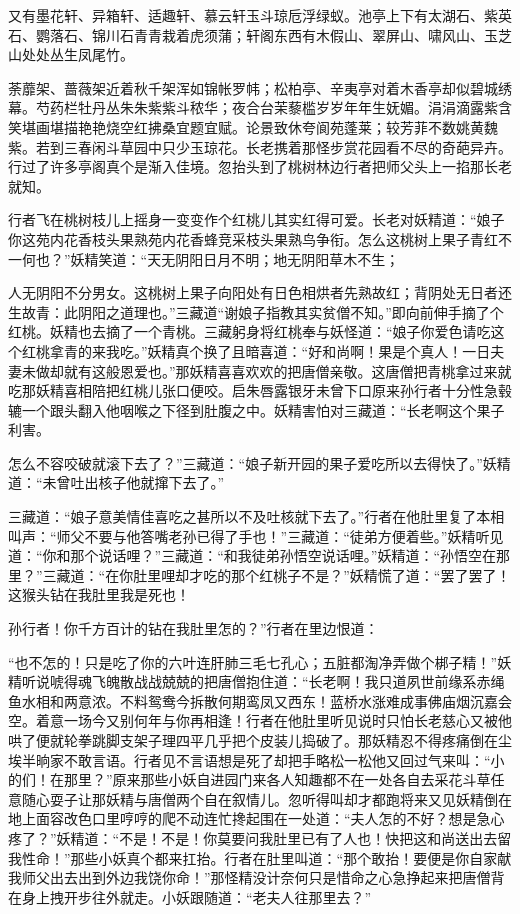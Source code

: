 \documentclass[12pt,UTF8]{ctexbook}
\begin{document}
{	又有墨花轩、异箱轩、适趣轩、慕云轩玉斗琼卮浮绿蚁。池亭上下有太湖石、紫英石、鹦落石、锦川石青青栽着虎须蒲；轩阁东西有木假山、翠屏山、啸风山、玉芝山处处丛生凤尾竹。
	
	荼蘼架、蔷薇架近着秋千架浑如锦帐罗帏；松柏亭、辛夷亭对着木香亭却似碧城绣幕。芍药栏牡丹丛朱朱紫紫斗秾华；夜合台茉藜槛岁岁年年生妩媚。涓涓滴露紫含笑堪画堪描艳艳烧空红拂桑宜题宜赋。论景致休夸阆苑蓬莱；较芳菲不数姚黄魏紫。若到三春闲斗草园中只少玉琼花。长老携着那怪步赏花园看不尽的奇葩异卉。行过了许多亭阁真个是渐入佳境。忽抬头到了桃树林边行者把师父头上一掐那长老就知。
	
	行者飞在桃树枝儿上摇身一变变作个红桃儿其实红得可爱。长老对妖精道：“娘子你这苑内花香枝头果熟苑内花香蜂竞采枝头果熟鸟争衔。怎么这桃树上果子青红不一何也？”妖精笑道：“天无阴阳日月不明；地无阴阳草木不生；
	
	人无阴阳不分男女。这桃树上果子向阳处有日色相烘者先熟故红；背阴处无日者还生故青：此阴阳之道理也。”三藏道“谢娘子指教其实贫僧不知。”即向前伸手摘了个红桃。妖精也去摘了一个青桃。三藏躬身将红桃奉与妖怪道：“娘子你爱色请吃这个红桃拿青的来我吃。”妖精真个换了且暗喜道：“好和尚啊！果是个真人！一日夫妻未做却就有这般恩爱也。”那妖精喜喜欢欢的把唐僧亲敬。这唐僧把青桃拿过来就吃那妖精喜相陪把红桃儿张口便咬。启朱唇露银牙未曾下口原来孙行者十分性急毂辘一个跟头翻入他咽喉之下径到肚腹之中。妖精害怕对三藏道：“长老啊这个果子利害。
	
	怎么不容咬破就滚下去了？”三藏道：“娘子新开园的果子爱吃所以去得快了。”妖精道：“未曾吐出核子他就撺下去了。”
	
	三藏道：“娘子意美情佳喜吃之甚所以不及吐核就下去了。”行者在他肚里复了本相叫声：“师父不要与他答嘴老孙已得了手也！”三藏道：“徒弟方便着些。”妖精听见道：“你和那个说话哩？”三藏道：“和我徒弟孙悟空说话哩。”妖精道：“孙悟空在那里？”三藏道：“在你肚里哩却才吃的那个红桃子不是？”妖精慌了道：“罢了罢了！这猴头钻在我肚里我是死也！
	
	孙行者！你千方百计的钻在我肚里怎的？”行者在里边恨道：
	
	“也不怎的！只是吃了你的六叶连肝肺三毛七孔心；五脏都淘净弄做个梆子精！”妖精听说唬得魂飞魄散战战兢兢的把唐僧抱住道：“长老啊！我只道夙世前缘系赤绳鱼水相和两意浓。不料鸳鸯今拆散何期鸾凤又西东！蓝桥水涨难成事佛庙烟沉嘉会空。着意一场今又别何年与你再相逢！行者在他肚里听见说时只怕长老慈心又被他哄了便就轮拳跳脚支架子理四平几乎把个皮装儿捣破了。那妖精忍不得疼痛倒在尘埃半晌家不敢言语。行者见不言语想是死了却把手略松一松他又回过气来叫：“小的们！在那里？”原来那些小妖自进园门来各人知趣都不在一处各自去采花斗草任意随心耍子让那妖精与唐僧两个自在叙情儿。忽听得叫却才都跑将来又见妖精倒在地上面容改色口里哼哼的爬不动连忙搀起围在一处道：“夫人怎的不好？想是急心疼了？”妖精道：“不是！不是！你莫要问我肚里已有了人也！快把这和尚送出去留我性命！”那些小妖真个都来扛抬。行者在肚里叫道：“那个敢抬！要便是你自家献我师父出去出到外边我饶你命！”那怪精没计奈何只是惜命之心急挣起来把唐僧背在身上拽开步往外就走。小妖跟随道：“老夫人往那里去？”
	
}
\end{document}
